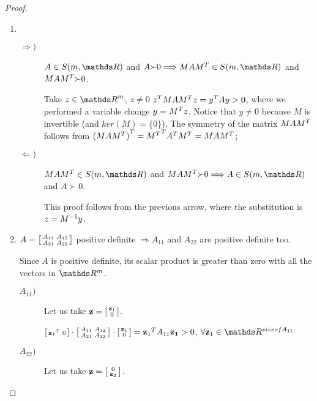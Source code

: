 \documentclass[computationalMathematics.tex]{subfiles}
\begin{document}
\begin{proof}~\\
   \begin{enumerate}
    \item~\\
      \begin{description}
        \item[$\Rightarrow)$]
          $A \in S(m, \R)$ and $A {\succ} 0  \Longrightarrow MA\tr{M} \in S(m, \R)$ and $MA{M}^{T} {\succ} 0$.

          Take $z \in {\R}^m$, $z\neq 0$ ${z}^{T} MA{M}^{T} z = {y}^{T} Ay > 0$, where we performed a variable change $y = {M}^{T} z$. Notice that $y \neq 0$ because $M$ is invertible (and $ker(M) = \{ 0 \}$). The symmetry of the matrix $MA{M}^{T}$ follows from ${(MA{M}^{T})}^{T} = {{M}^{T}}^{T} {A}^{T} {M}^{T} = MA{M}^{T}$;
        \item[$\Leftarrow)$]
          $MA\tr{M} \in S(m, \R)$ and $MA\tr{M} {\succ} 0  \Longrightarrow A \in S(m, \R)$ and $A {\succ} 0$.
          
          This proof follows from the previous arrow, where the substitution is $z = {M}^{-1}y$.
            \end{description}
     \item $A = \begin{bsmallmatrix}
	    A_{11} & A_{12}\\
	    A_{21} & A_{22}
     \end{bsmallmatrix}$ positive definite $\Longrightarrow A_{11}$ and $A_{22}$ are positive definite too.

      Since $A$ is positive definite, its scalar product is greater than zero with all the vectors in $\R^m$. 
  \begin{description}
    \item[$A_{11})$]
      Let us take $\mathbf{z}=
        \begin{bsmallmatrix}
          \mathbf{z}_1\\0
        \end{bsmallmatrix}$.

        $\begin{bsmallmatrix}
          {\mathbf{z}_1}^{T} &0\\
        \end{bsmallmatrix} 
        \cdot 
        \begin{bsmallmatrix}
	        A_{11} & A_{12}\\
	        A_{21} & A_{22}
        \end{bsmallmatrix}
        \cdot 
        \begin{bsmallmatrix}
          \mathbf{z}_1\\0
        \end{bsmallmatrix}
        = {\mathbf{z}_1}^{T} A_{11} \mathbf{z_1} > 0$, $\forall \mathbf{z}_1 \in \R^{size of A_{11}}$
      \item[$A_{22})$]
      Let us take $\mathbf{z}=
      \begin{bsmallmatrix}
        0\\\mathbf{z}_2
      \end{bsmallmatrix}$.


\end{description}
\end{enumerate}
\end{proof}
\end{document}
